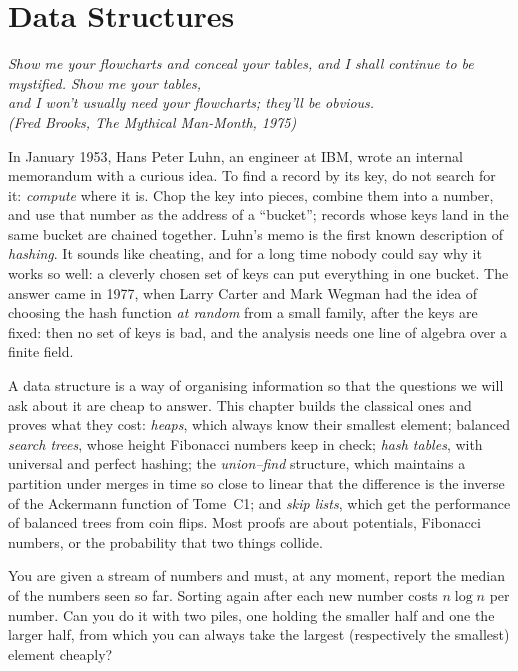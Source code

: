 \chapter{Data Structures}\label{ch:datastructures}

\begin{center}\itshape
Show me your flowcharts and conceal your tables, and I shall continue to be mystified. Show me your tables,\\
and I won't usually need your flowcharts; they'll be obvious.\\
\upshape(Fred Brooks, \emph{The Mythical Man-Month}, 1975)
\end{center}

In January 1953, Hans Peter Luhn, an engineer at IBM, wrote an internal memorandum with a curious idea. To find a record by its key,
do not search for it: \emph{compute} where it is. Chop the key into pieces, combine them into a number, and use that number as the
address of a ``bucket''; records whose keys land in the same bucket are chained together. Luhn's memo is the first known description
of \emph{hashing}. It sounds like cheating, and for a long time nobody could say why it works so well: a cleverly chosen set of keys can put
everything in one bucket. The answer came in 1977, when Larry Carter and Mark Wegman had the idea of choosing the hash function \emph{at
random} from a small family, after the keys are fixed: then no set of keys is bad, and the analysis needs one line of algebra over a finite field.

A data structure is a way of organising information so that the questions we will ask about it are cheap to answer. This chapter builds the
classical ones and proves what they cost: \emph{heaps}, which always know their smallest element; balanced \emph{search trees}, whose height
Fibonacci numbers keep in check; \emph{hash tables}, with universal and perfect hashing; the \emph{union--find} structure, which maintains a
partition under merges in time so close to linear that the difference is the inverse of the Ackermann function of Tome~C1; and \emph{skip lists},
which get the performance of balanced trees from coin flips. Most proofs are about potentials, Fibonacci numbers, or the probability that two
things collide.

\begin{think}
You are given a stream of numbers and must, at any moment, report the median of the numbers seen so far. Sorting again after each new
number costs $n\log n$ per number. Can you do it with two piles, one holding the smaller half and one the larger half, from which you can always
take the largest (respectively the smallest) element cheaply?
\end{think}

